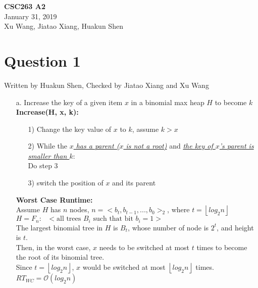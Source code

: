 \documentclass[10pt]{article}
\begin{document}
\noindent \textbf{CSC263 A2}\\
January 31, 2019\\
Xu Wang, Jiatao Xiang, Huakun Shen
\section*{Question 1}
Written by Huakun Shen, Checked by Jiatao Xiang and Xu Wang
\begin{enumerate}
\item[a.] Increase the key of a given item $x$ in a binomial max heap $H$ to
become $k$\\
\textbf{Increase(H, x, k):}
\begin{enumerate}
\item[1)]Change the key value of $x$ to $k$, assume $k>x$
\item[2)]While the \underline{\textit{$x$ has a parent ($x$ is not a root)}} and \underline{\textit{the key of $x$'s parent is smaller than $k$}}:\\
Do step 3
\item[3)]switch the position of $x$ and its parent
\end{enumerate}
\textbf{Worst Case Runtime:}\\
Assume $H$ has $n$ nodes, $n=<b_t,b_{t-1},...,b_0>_2$,		where $t=\left\lfloor log_2n\right\rfloor$\\
$H=F_n:\text{ }<\text{all trees } B_i \text{ such that bit }b_i = 1>$\\
The largest binomial tree in $H$ is $B_t$, whose number of node is $2^t$, and height is $t$.\\
Then, in the worst case, $x$ needs to be switched at most $t$ times to become the root of its binomial tree.\\
Since $t=\left\lfloor log_2n\right\rfloor$, $x$ would be switched at most $\left\lfloor log_2n\right\rfloor$ times.\\
$RT_{WC}=\mathcal{O}(log_2n)$




\end{enumerate}
\end{document}
